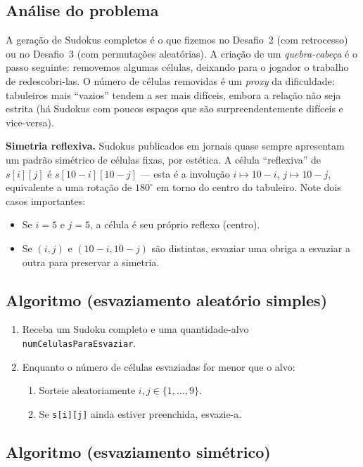 \documentclass[11pt,a4paper,oneside]{report}
\newcommand{\codigo}[1]{\texttt{\color{deitelblue}#1}}
\begin{document}
\subsection{Análise do problema}

A geração de Sudokus completos é o que fizemos no Desafio~2 (com
retrocesso) ou no Desafio~3 (com permutações aleatórias). A criação de
um \emph{quebra-cabeça} é o passo seguinte: removemos algumas células,
deixando para o jogador o trabalho de redescobri-las. O número de
células removidas é um \emph{proxy} da dificuldade: tabuleiros mais
``vazios'' tendem a ser mais difíceis, embora a relação não seja estrita
(há Sudokus com poucos espaços que são surpreendentemente difíceis e
vice-versa).

\textbf{Simetria reflexiva.} Sudokus publicados em jornais quase sempre
apresentam um padrão simétrico de células fixas, por estética. A célula
``reflexiva'' de $s[i][j]$ é $s[10 - i][10 - j]$ --- esta é a
involução $i \mapsto 10 - i$, $j \mapsto 10 - j$, equivalente a uma
rotação de $180^\circ$ em torno do centro do tabuleiro. Note dois casos
importantes:
\begin{itemize}
    \item Se $i = 5$ e $j = 5$, a célula é seu próprio reflexo (centro).
    \item Se $(i, j)$ e $(10 - i, 10 - j)$ são distintas, esvaziar uma
        obriga a esvaziar a outra para preservar a simetria.
\end{itemize}

\subsection{Algoritmo (esvaziamento aleatório simples)}

\begin{enumerate}
    \item Receba um Sudoku completo e uma quantidade-alvo
        \codigo{numCelulasParaEsvaziar}.
    \item Enquanto o número de células esvaziadas for menor que o alvo:
    \begin{enumerate}
        \item Sorteie aleatoriamente $i, j \in \{1, \ldots, 9\}$.
        \item Se \codigo{s[i][j]} ainda estiver preenchida, esvazie-a.
    \end{enumerate}
\end{enumerate}

\subsection{Algoritmo (esvaziamento simétrico)}
\end{document}
